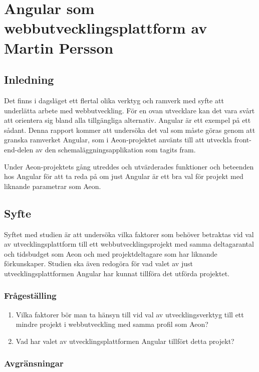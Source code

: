 \chapter{Angular som webbutvecklingsplattform av Martin Persson}

\vspace{1.5em}
\section{Inledning}

Det finns i dagsläget ett flertal olika verktyg och ramverk med syfte att underlätta arbete med webbutveckling. För en ovan utvecklare kan det vara svårt att orientera sig bland alla tillgängliga alternativ. Angular är ett exempel på ett sådant. Denna rapport kommer att undersöka det val som måste göras genom att granska ramverket Angular, som i Aeon-projektet använts till att utveckla front-end-delen av den schemaläggningsapplikation som tagits fram.

Under Aeon-projektets gång utreddes och utvärderades funktioner och beteenden hos Angular för att ta reda på om just Angular är ett bra val för projekt med liknande parametrar som Aeon.

\section{Syfte}

Syftet med studien är att undersöka vilka faktorer som behöver betraktas vid val av utvecklingsplattform till ett webbutvecklingsprojekt med samma deltagarantal och tidsbudget som Aeon och med projektdeltagare som har liknande förkunskaper. Studien ska även redogöra för vad valet av just utvecklingsplattformen Angular har kunnat tillföra det utförda projektet.

\subsection{Frågeställing}
\begin{enumerate}
	\item Vilka faktorer bör man ta hänsyn till vid val av utvecklingsverktyg till ett mindre projekt i webbutveckling med samma profil som Aeon?
	\item Vad har valet av utvecklingsplattformen Angular tillfört detta projekt? 
\end{enumerate}

\subsection{Avgränsningar}

